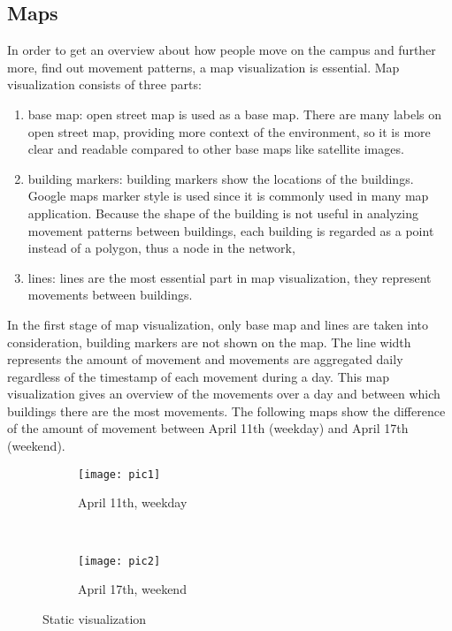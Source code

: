 \subsection{Maps}\label{maps}
In order to get an overview about how people move on the campus and further more,  find out movement patterns, a map visualization is essential. Map visualization consists of three parts: 
\begin{enumerate}
\item base map: open street map is used as a base map. There are many labels on open street map, providing more context of the environment, so it is more clear and readable compared to other base maps like satellite images.
\item building markers: building markers show the locations of the buildings. Google maps marker style is used since it is commonly used in many map application. Because the shape of the building is not useful in analyzing movement patterns between buildings, each building is regarded as a point instead of a polygon, thus a node in the network, 
\item lines: lines are the most essential part in map visualization, they represent movements between buildings.
\end{enumerate}

In the first stage of map visualization, only base map and lines are taken into consideration, building markers are not shown on the map. The line width represents the amount of movement and movements are aggregated daily regardless of the timestamp of each movement during a day. This map visualization gives an overview of the movements over a day and between which buildings there are the most movements. The following maps show the difference of the amount of movement between April 11th (weekday) and April 17th (weekend).

\begin{figure}[H]
\captionsetup[subfigure]{justification=centering}
    \centering
    \begin{subfigure}[t]{0.5\textwidth}
        \centering
        \texttt{[image: pic1]}
        \caption{April 11th, weekday}
    \end{subfigure}%
    ~ 
    \begin{subfigure}[t]{0.5\textwidth}
        \centering
        \texttt{[image: pic2]}
        \caption{April 17th, weekend}
    \end{subfigure}
    \captionsetup{justification=centering}
    \caption{Static visualization}
    \label{staticvisualization}
\end{figure}

